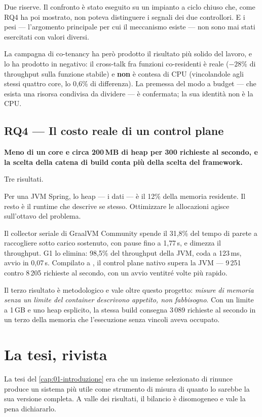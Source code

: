 Due riserve. Il confronto \`e stato eseguito su un impianto a ciclo chiuso che,
come RQ4 ha poi mostrato, non poteva distinguere i segnali dei due controllori.
E i pesi --- l'argomento principale per cui il meccanismo esiste --- non sono mai
stati esercitati con valori diversi.

La campagna di co-tenancy ha per\`o prodotto il risultato pi\`u solido del lavoro,
e lo ha prodotto in negativo: il cross-talk fra funzioni co-residenti \`e reale
($-28\%$ di throughput sulla funzione stabile) e \textbf{non} \`e contesa di CPU
(vincolandole agli stessi quattro core, lo 0{,}6\% di differenza). La premessa
del modo a budget --- che esista una risorsa condivisa da dividere --- \`e
confermata; la sua identit\`a non \`e la CPU.

\subsection{RQ4 --- Il costo reale di un control plane}

\textbf{Meno di un core e circa 200\,MB di heap per 300 richieste al secondo, e
la scelta della catena di build conta pi\`u della scelta del framework.}

Tre risultati.

Per una JVM Spring, lo heap --- i dati --- \`e il 12\% della memoria residente. Il
resto \`e il runtime che descrive se stesso. Ottimizzare le allocazioni agisce
sull'ottavo del problema.

Il collector seriale di GraalVM Community spende il 31{,}8\% del tempo di parete
a raccogliere sotto carico sostenuto, con pause fino a 1{,}77\,s, e dimezza il
throughput. G1 lo elimina: 98{,}5\% del throughput della JVM, coda a 123\,ms,
avvio in 0{,}07\,s. Compilato a , il control plane nativo supera la
JVM --- 9\,251 contro 8\,205 richieste al secondo, con un avvio ventitr\'e volte
pi\`u rapido.

Il terzo risultato \`e metodologico e vale oltre questo progetto: \emph{misure di
memoria senza un limite del container descrivono appetito, non fabbisogno}. Con
un limite a 1\,GB e uno heap esplicito, la stessa build consegna 3\,089
richieste al secondo in un terzo della memoria che l'esecuzione senza vincoli
aveva occupato.

\section{La tesi, rivista}

La tesi del \cref{cap:01-introduzione} era che un insieme selezionato di rinunce
produce un sistema pi\`u utile come strumento di misura di quanto lo sarebbe la
sua versione completa. A valle dei risultati, il bilancio \`e disomogeneo e vale
la pena dichiararlo.

